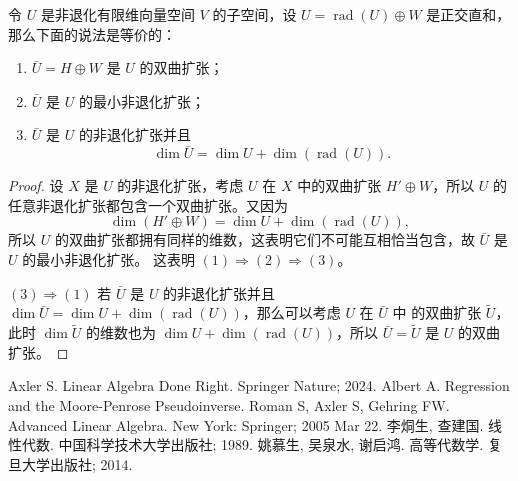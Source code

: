 \documentclass[fontset=none,zihao=-4]{Notes}
\DeclareMathOperator\rad{rad}
\begin{document}
\begin{theorem}[非退化完备化定理]
  令 $U$ 是非退化有限维向量空间 $V$ 的子空间，设 $U=\rad(U)\oplus W$ 是正交直和，
  那么下面的说法是等价的：
  \begin{enumerate}
    \item $\bar U=H\oplus W$ 是 $U$ 的双曲扩张；
    \item $\bar U$ 是 $U$ 的最小非退化扩张；
    \item $\bar U$ 是 $U$ 的非退化扩张并且
    \[
      \dim\bar U=\dim U+\dim(\rad(U)).  
    \]
  \end{enumerate}
\end{theorem}
\begin{proof}
  设 $X$ 是 $U$ 的非退化扩张，考虑 $U$ 在 $X$ 中的双曲扩张
  $H'\oplus W$，所以 $U$ 的任意非退化扩张都包含一个双曲扩张。又因为
  \[
    \dim(H'\oplus W)=  \dim U+\dim(\rad(U)),
  \]
  所以 $U$ 的双曲扩张都拥有同样的维数，这表明它们不可能互相恰当包含，故 $\bar U$ 是 $U$ 的最小非退化扩张。
  这表明 $(1)\Rightarrow (2)\Rightarrow (3)$。

  $(3)\Rightarrow (1)$ 若 $\bar U$ 是 $U$ 的非退化扩张并且
  $\dim\bar U=\dim U+\dim(\rad(U))$，那么可以考虑 $U$ 在 $\bar{U}$ 中
  的双曲扩张 $\tilde{U}$，此时 $\dim\tilde{ U}$ 的维数也为
  $\dim U+\dim(\rad(U))$，所以 $\bar U=\tilde{U}$ 是 $U$ 的双曲扩张。
\end{proof}



\begin{thebibliography}{99}
    Axler S. Linear Algebra Done Right. Springer Nature; 2024.
   Albert A. Regression and the Moore-Penrose Pseudoinverse.
   Roman S, Axler S, Gehring FW. Advanced Linear Algebra. New York: Springer; 2005 Mar 22.
   李烔生, 查建国. 线性代数. 中国科学技术大学出版社; 1989.
   姚慕生, 吴泉水, 谢启鸿. 高等代数学. 复旦大学出版社; 2014.
\end{thebibliography}
\end{document}
